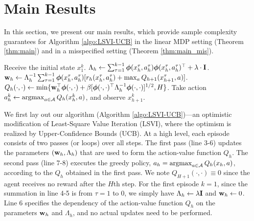 

\section{Main Results} \label{sec:results}

In this section, we present our main results, which provide sample complexity guarantees for Algorithm \ref{algo:LSVI-UCB} in the linear MDP setting (Theorem \ref{thm:main}) and in a misspecified setting (Theorem \ref{thm:main_mis}). 

\begin{algorithm}[t]
\caption{Least-Squares Value Iteration with UCB (LSVI-UCB)}\label{algo:LSVI-UCB}
\begin{algorithmic}[1]
\State Receive the initial state $x^k_1$.
\State $\Lambda_h \leftarrow \sum_{\tau =1}^{k-1}  \bm{\phi}(x^{\tau}_h,  a^{\tau}_h)\bm{\phi}(x^{\tau}_h, a^{\tau}_h)^{\top} + \lambda \cdot  \mathbf{I}$. \label{line:Lambda}
\State $\mathbf{w}_h \leftarrow \Lambda_h^{-1} \sum_{\tau=1}^{k-1} \bm{\phi}(x^{\tau}_h,  a^{\tau}_h) [r_h(x^{\tau}_h, a^{\tau}_h) + \max_a Q_{h+1}(x^{\tau}_{h+1}, a)]$. \label{line:w}
\State $Q_h(\cdot, \cdot) \leftarrow \min\{\mathbf{w}_h^{\top}\bm{\phi}(\cdot, \cdot) + \beta  [\bm{\phi}(\cdot, \cdot)^\top \Lambda_h^{-1} \bm{\phi}(\cdot, \cdot)]^{1/2}, H\}$. \label{line:ucb}
\EndFor
\State Take action $a^k_h \gets  \mathop{\rm argmax}_{a \in \mathcal{A} } Q_h(x^k_h, a)$, and observe $x^k_{h+1}$. 
\EndFor
\EndFor
\end{algorithmic}
\end{algorithm}

We first lay out our algorithm (Algorithm \ref{algo:LSVI-UCB})---an optimistic modification of Least-Square Value Iteration (LSVI), where the optimism is realized by Upper-Confidence Bounds (UCB). At a high level, each episode consists of two passes (or loops) over all steps. The first pass (line 3-6) updates the parameters $(\mathbf{w}_h, \Lambda_h)$ that are used to form the action-value function $Q_h$. The second pass (line 7-8) executes the greedy policy, $a_h = \mathop{\rm argmax}_{a \in \mathcal{A}} Q_h(x_h, a)$, according to the $Q_h$ obtained in the first pass. We note $Q_{H+1}(\cdot, \cdot)\equiv 0$ since the agent receives no reward after the $H$th step. For the first episode $k=1$, since the summation in line 4-5 is from $\tau = 1$ to $0$, we simply have $\Lambda_h \leftarrow \lambda \mathbf{I}$ and $\mathbf{w}_h \leftarrow 0$. Line 6 specifies the dependency of the action-value function $Q_h$ on the parameters $\mathbf{w}_h$ and $\Lambda_h$, and no actual updates need to be performed.

